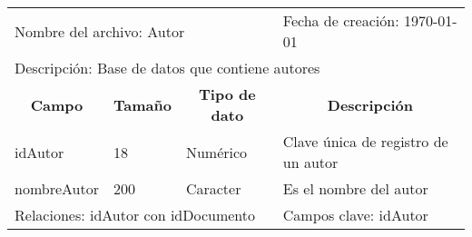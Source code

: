 \begin{table}[H]
\begin{tabular}{lllp{10cm}}
\multicolumn{3}{l}{Nombre del archivo: Autor} & \multicolumn{1}{l}{Fecha de creación: \today}\\
\multicolumn{4}{l}{Descripción: Base de datos que contiene autores} \\ \hline
\multicolumn{1}{c}{\textbf{Campo}} & \multicolumn{1}{c}{\textbf{Tamaño}} & \multicolumn{1}{c}{\textbf{Tipo de dato}} & \multicolumn{1}{c}{\textbf{Descripción}} \\ \hline

idAutor   & 18   & Numérico    & Clave única de registro de un autor  \\
nombreAutor    & 200  & Caracter   & Es el nombre del autor \\
\hline
\multicolumn{3}{l}{Relaciones: idAutor con idDocumento} & \multicolumn{1}{l}{Campos clave: idAutor}          
\end{tabular}
\end{table}

